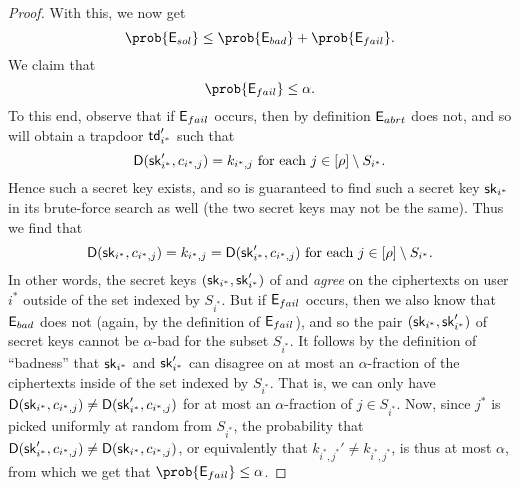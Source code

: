 \begin{proof}

  With this, we now get
  \[
    \prob{\eventE_{sol}} \le \prob{\eventE_{bad}} + \prob{\eventE_{fail}}.
  \]
  We claim that
  \[
    \prob{\eventE_{fail}} \le \alpha.
  \]
  To this end, observe that if \(\mathsf{E}_{fail}\) occurs,
  then by definition \(\mathsf{E}_{abrt}\) does not, and so
  \redM will obtain a trapdoor \(\mathsf{td}_{i^{*}}'\) such that
  \[
    \mathsf{D}(\mathsf{sk}_{i^{*}}',c_{i^{*},j}) = k_{i^{*},j} \text{ for each } j \in [\rho] \setminus S_{i^{*}}.
  \]
  Hence such a secret key exists, and so \advA is guaranteed to find such a secret key \(\mathsf{sk}_{i^{*}}\)
  in its brute-force search as well (the two secret keys may not be the same).
  Thus we find that
  \[
    \mathsf{D}(\mathsf{sk}_{i^{*}},c_{i^{*},j}) = k_{i^{*},j} = \mathsf{D}(\mathsf{sk}_{i^{*}}',c_{i^{*},j}) \text{ for each } j \in [\rho] \setminus S_{i^{*}}.
  \]
  In other words, the secret keys \((\mathsf{sk}_{i^{*}},\mathsf{sk}_{i^{*}}')\)
  of \advA and \redM \emph{agree} on the ciphertexts on user \(i^{*}\) outside of the set indexed by \(S_{i^{*}}\).
  But if \(\mathsf{E}_{fail}\) occurs, then we also know that \(\mathsf{E}_{bad}\) does not
  (again, by the definition of \(\mathsf{E}_{fail}\)),
  and so the pair \((\mathsf{sk}_{i^{*}},\mathsf{sk}_{i^{*}}')\) of secret keys cannot be
  \(\alpha\)-bad for the subset \(S_{i^{*}}\).
  It follows by the definition of ``badness'' that \(\mathsf{sk}_{i^{*}}\) and \(\mathsf{sk}_{i^{*}}'\)
  can disagree on at most an \(\alpha\)-fraction of the ciphertexts inside of the set indexed by \(S_{i^{*}}\).
  That is, we can only have
  \(\mathsf{D}(\mathsf{sk}_{i^{*}},c_{i^{*},j}) \ne \mathsf{D}(\mathsf{sk}_{i^{*}}',c_{i^{*},j})\)
  for at most an \(\alpha\)-fraction of \(j \in S_{i^{*}}\).
  Now, since \(j^{*}\) is picked uniformly at random from \(S_{i^{*}}\),
  the probability that
  \(\mathsf{D}(\mathsf{sk}_{i^{*}}',c_{i^{*},j}) \ne \mathsf{D}(\mathsf{sk}_{i^{*}},c_{i^{*},j})\),
  or equivalently that \(k_{i^{*},j^{*}}' \ne k_{i^{*},j^{*}}\),
  is thus at most \(\alpha\),
  from which we get that \(\prob{\eventE_{fail}} \le \alpha\).


\end{proof}
